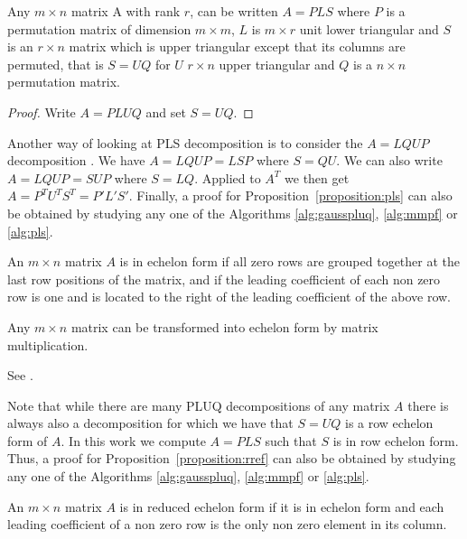 \begin{proposition}
\label{proposition:pls}
Any $m \times n$ matrix A with rank $r$, can be written $A = P L S$ where $P$ is a permutation matrix of dimension $m \times m$, $L$ is $m \times r$ unit lower triangular and $S$ is an $r \times n$ matrix which is upper triangular except that its columns are permuted, that is $S = UQ$ for $U$ $r \times n$ upper triangular and $Q$ is a $n \times n$ permutation matrix.
\end{proposition}

\begin{proof}
Write $A = PLUQ$ and set $S = UQ$. 
\end{proof}

Another way of looking at PLS decomposition is to consider the $A = LQUP$ decomposition \cite{ibarra-moran-hui:1982}. We have $A = LQUP = LSP$ where $S = QU$. We can also write $A = LQUP = SUP$ where $S=LQ$. Applied to $A^T$ we then get $A=P^TU^TS^T = P'L'S'$. Finally, a proof for Proposition~\ref{proposition:pls} can also be obtained by studying any one of the Algorithms \ref{alg:gausspluq}, \ref{alg:mmpf} or \ref{alg:pls}.

\begin{definition} An $m \times n$ matrix $A$ is in echelon form if all zero rows are grouped together at the last row positions of the matrix, and if the leading coefficient of each non zero row is one and is located to the right of the leading coefficient of the above row.
\end{definition}

\begin{proposition}
\label{proposition:rref}
Any $m \times n$ matrix can be transformed into echelon form by matrix multiplication.
\end{proposition}

\noindent
\begin{citeproof}
See \cite{jeannerod-pernet-storjohann:pluq2010}.
\end{citeproof}

Note that while there are many PLUQ decompositions of any matrix $A$ there is always also a decomposition for which we have that $S = UQ$ is a row echelon form of $A$. In this work we compute $A = PLS$ such that $S$ is in row echelon form. Thus, a proof for Proposition~\ref{proposition:rref} can also be obtained by studying any one of the Algorithms \ref{alg:gausspluq}, \ref{alg:mmpf} or \ref{alg:pls}.

\begin{definition}
An $m \times n$ matrix $A$ is in reduced echelon form if it is in echelon form and each leading coefficient of a non zero row is the only non zero element in its column.
\end{definition}

